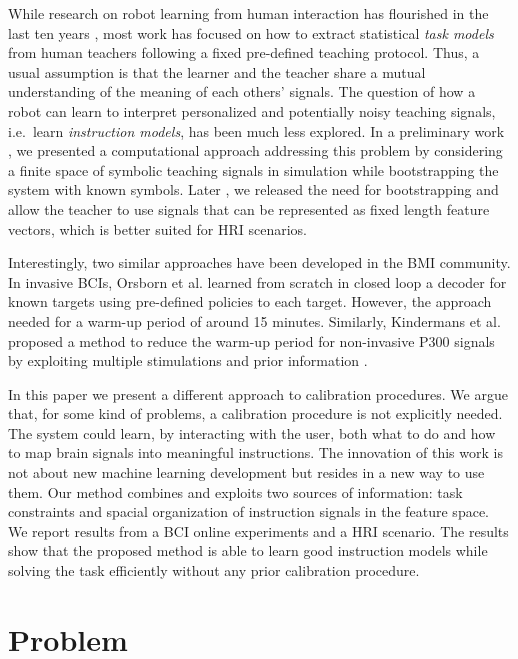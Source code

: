 \documentclass[conference]{IEEEtran}
\begin{document}
While research on robot learning from human interaction has flourished in the last ten years \cite{Argall09lfdsurvey}, most work has focused on how to extract statistical \textit{task models} from human teachers following a fixed pre-defined teaching protocol. Thus, a usual assumption is that the learner and the teacher share a mutual understanding of the meaning of each others' signals. The question of how a robot can learn to interpret personalized and potentially noisy teaching signals, i.e.\ learn \textit{instruction models}, has been much less explored. In a preliminary work \cite{macl11simul}, we presented a computational approach addressing this problem by considering a finite space of symbolic teaching signals in simulation while bootstrapping the system with known symbols. Later \cite{grizou2013}, we released the need for bootstrapping and allow the teacher to use  signals that can be represented as fixed length feature vectors, which is better suited for HRI scenarios.

Interestingly, two similar approaches have been developed in the BMI community. In invasive BCIs, Orsborn et al. \cite{Orsborn2012} learned from scratch in closed loop a decoder for known targets using pre-defined policies to each target. However, the approach needed for a warm-up period of around 15 minutes. Similarly, Kindermans et al. proposed a method to reduce the warm-up period for non-invasive P300 signals by exploiting multiple stimulations and prior information \cite{Kindermans2012a,Kindermans2012b}.

In this paper we present a different approach to calibration procedures. We argue that, for some kind of problems, a calibration procedure is not explicitly needed. The system could learn, by interacting with the user, both what to do and how to map brain signals into meaningful instructions. The innovation of this work is not about new machine learning development but resides in a new way to use them. Our method combines and exploits two sources of information: task constraints and spacial organization of  instruction signals in the feature space. We report results from a BCI online experiments and a HRI scenario. The results show that the proposed method is able to learn good instruction models while solving the task efficiently without any prior calibration procedure.

\section{Problem}
\end{document}
